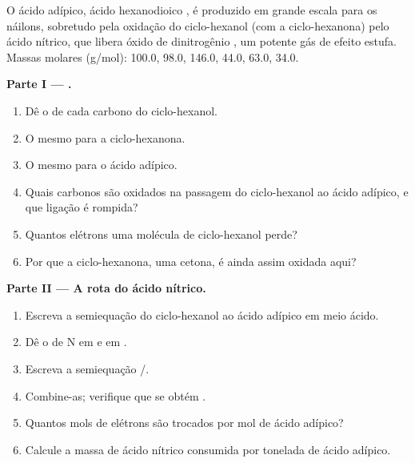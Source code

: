 \begin{problem}
\label{pb:b1:organic-redox:1}
O ácido adípico, ácido hexanodioico , é produzido em
grande escala para os náilons, sobretudo pela oxidação do ciclo-hexanol
(com a ciclo-hexanona) pelo ácido nítrico, que libera óxido de
dinitrogênio , um potente gás de efeito estufa. Massas molares (\unit{g/mol}):  100.0,
 98.0,  146.0,  44.0,  63.0,
 34.0.

\medskip
\noindent\textbf{Parte I --- .}
\begin{enumerate}
  \item Dê o  de cada carbono do ciclo-hexanol.
  \item O mesmo para a ciclo-hexanona.
  \item O mesmo para o ácido adípico.
  \item Quais carbonos são oxidados na passagem do ciclo-hexanol ao ácido
        adípico, e que ligação é rompida?
  \item Quantos elétrons uma molécula de ciclo-hexanol perde?
  \item Por que a ciclo-hexanona, uma cetona, é ainda assim oxidada aqui?
\end{enumerate}

\medskip
\noindent\textbf{Parte II --- A rota do ácido nítrico.}
\begin{enumerate}[resume]
  \item Escreva a semiequação do ciclo-hexanol ao ácido adípico em meio ácido.
  \item Dê o  de N em  e em .
  \item Escreva a semiequação /.
  \item Combine-as; verifique que se obtém
        .
  \item Quantos mols de elétrons são trocados por mol de ácido
        adípico?
  \item Calcule a massa de ácido nítrico consumida por tonelada de ácido adípico.
\end{enumerate}


\end{problem}
